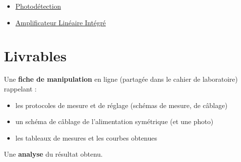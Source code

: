 \begin{itemize}	
	\item \href{https://lense.institutoptique.fr/ressources/Annee1/Electronique/fiches/2020_FR_Photodetection.pdf}{Photodétection}
	\item \href{https://lense.institutoptique.fr/ressources/Annee1/Electronique/fiches/2021_FR_ALI.pdf}{Amplificateur Linéaire Intégré}
\end{itemize}






\section{Livrables}


Une \textbf{fiche de manipulation} en ligne (partagée dans le cahier de laboratoire) rappelant :

\begin{itemize}
	\item les protocoles de mesure et de réglage (schémas de mesure, de câblage)
	\item un schéma de câblage de l'alimentation symétrique (et une photo)	
	\item les tableaux de mesures et les courbes obtenues
\end{itemize}

Une \textbf{analyse} du résultat obtenu.


